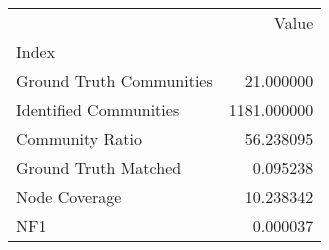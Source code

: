 \begin{tabular}{lr}
\toprule
{} &        Value \\
Index                    &              \\
\midrule
Ground Truth Communities &    21.000000 \\
Identified Communities   &  1181.000000 \\
Community Ratio          &    56.238095 \\
Ground Truth Matched     &     0.095238 \\
Node Coverage            &    10.238342 \\
NF1                      &     0.000037 \\
\bottomrule
\end{tabular}
